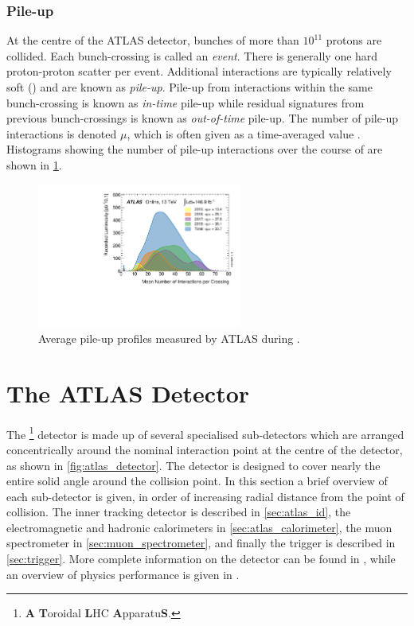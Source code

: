 \subsubsection{Pile-up}

At the centre of the ATLAS detector, bunches of more than $10^{11}$ protons are collided.
Each bunch-crossing is called an \textit{event}.
There is generally one hard proton-proton scatter per event.
Additional interactions are typically relatively soft (\lowpt) and are known as \textit{pile-up}.
Pile-up from interactions within the same bunch-crossing is known as \textit{in-time} pile-up while residual signatures from previous bunch-crossings is known as \textit{out-of-time} pile-up.
The number of pile-up interactions is denoted $\mu$, which is often given as a time-averaged value \angles{\mu}.
Histograms showing the number of pile-up interactions over the course of \runtwo are shown in \cref{fig:run2_pile-up}.
%
\begin{figure}[!htbp]
  \centering
  \includegraphics[width=0.6\textwidth]{chapters/2.detector/figs/mu_2015_2018.pdf}
  \caption{
    Average pile-up profiles measured by ATLAS during \runtwo \cite{atlas-lumi-run2}.
  }
  \label{fig:run2_pile-up}
\end{figure}
%


\section{The ATLAS Detector}\label{sec:atlas_detector}

The \ATLAS\footnote{\textbf{A} \textbf{T}oroidal \textbf{L}HC \textbf{A}pparatu\textbf{S}.} detector is made up of several specialised sub-detectors which are arranged concentrically around the nominal interaction point at the centre of the detector, as shown in \cref{fig:atlas_detector}.
The detector is designed to cover nearly the entire solid angle around the collision point.
In this section a brief overview of each sub-detector is given, in order of increasing radial distance from the point of collision.
The inner tracking detector is described in \cref{sec:atlas_id}, the electromagnetic and hadronic calorimeters in \cref{sec:atlas_calorimeter}, the muon spectrometer in \cref{sec:muon_spectrometer}, and finally the trigger is described in \cref{sec:trigger}.
More complete information on the detector can be found in , while an overview of physics performance is given in \cite{ATLAS-TDR-14}.

